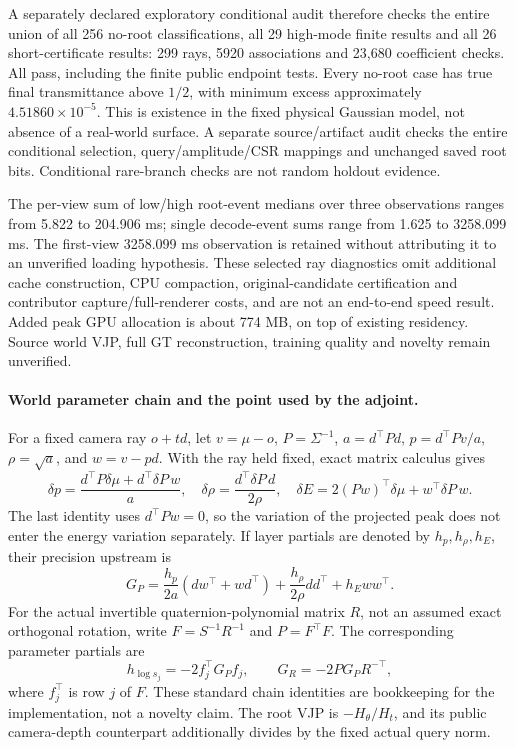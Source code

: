 \documentclass[11pt,a4paper]{article}
\begin{document}
A separately declared exploratory conditional audit therefore checks the
entire union of all 256 no-root classifications, all 29 high-mode finite
results and all 26 short-certificate results: 299 rays, 5920 associations
and 23,680 coefficient checks. All pass, including the finite public
endpoint tests. Every no-root case has true final transmittance above
$1/2$, with minimum excess approximately $4.51860\times10^{-5}$.
This is existence in the fixed physical Gaussian model, not absence of
a real-world surface. A separate source/artifact audit checks the entire
conditional selection, query/amplitude/CSR mappings and unchanged saved
root bits. Conditional rare-branch checks are not random holdout evidence.

The per-view sum of low/high root-event medians over three observations
ranges from 5.822 to 204.906 ms; single decode-event sums range from
1.625 to 3258.099 ms. The first-view 3258.099 ms observation is retained
without attributing it to an unverified loading hypothesis. These selected
ray diagnostics omit additional cache construction, CPU compaction,
original-candidate certification and contributor capture/full-renderer
costs, and are not an end-to-end speed result. Added peak GPU allocation
is about 774 MB, on top of existing residency. Source world VJP, full GT
reconstruction, training quality and novelty remain unverified.

\paragraph{World parameter chain and the point used by the adjoint.}
For a fixed camera ray $o+td$, let $v=\mu-o$, $P=\Sigma^{-1}$,
$a=d^\top Pd$, $p=d^\top Pv/a$, $\rho=\sqrt a$, and $w=v-pd$.
With the ray held fixed, exact matrix calculus gives
\[
 \delta p=\frac{d^\top P\delta\mu+d^\top\delta P\,w}{a},\quad
 \delta\rho=\frac{d^\top\delta P\,d}{2\rho},\quad
 \delta E=2(Pw)^\top\delta\mu+w^\top\delta P\,w.
\]
The last identity uses $d^\top Pw=0$, so the variation of the projected
peak does not enter the energy variation separately. If layer partials
are denoted by $h_p,h_\rho,h_E$, their precision upstream is
\[
 G_P=\frac{h_p}{2a}(dw^\top+wd^\top)
       +\frac{h_\rho}{2\rho}dd^\top+h_Eww^\top.
\]
For the actual invertible quaternion-polynomial matrix $R$, not an assumed
exact orthogonal rotation, write $F=S^{-1}R^{-1}$ and $P=F^\top F$.
The corresponding parameter partials are
\[
 h_{\log s_j}=-2f_j^\top G_P f_j,\qquad
 G_R=-2PG_PR^{-\top},
\]
where $f_j^\top$ is row $j$ of $F$. These standard chain identities are
bookkeeping for the implementation, not a novelty claim. The root VJP is
$-H_\theta/H_t$, and its public camera-depth counterpart additionally
divides by the fixed actual query norm.
\end{document}
